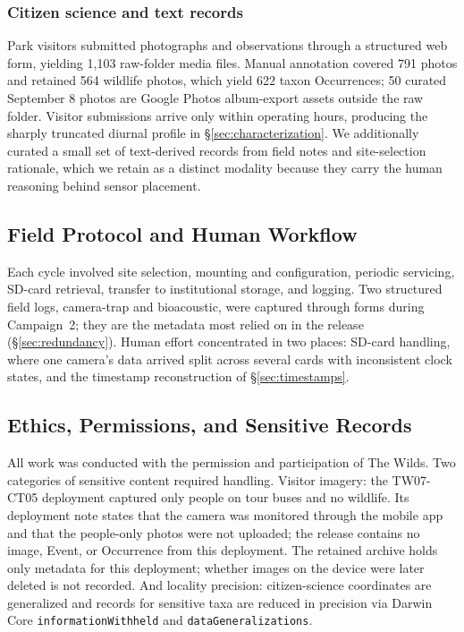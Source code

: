 \documentclass[sigconf]{acmart}
\begin{document}
\subsubsection{Citizen science and text records}
Park visitors submitted photographs and observations through a
structured web form, yielding 1{,}103 raw-folder media files. Manual annotation
covered 791 photos and retained 564 wildlife photos, which yield 622 taxon
Occurrences; 50 curated September 8 photos are Google Photos album-export assets
outside the raw folder. Visitor submissions arrive only within operating hours,
producing the sharply truncated
diurnal profile in \S\ref{sec:characterization}. We additionally
curated a small set of text-derived records from field notes and
site-selection rationale, which we retain as a distinct modality
because they carry the human reasoning behind sensor placement.

\subsection{Field Protocol and Human Workflow}

Each cycle involved site selection, mounting and configuration,
periodic servicing, SD-card retrieval, transfer to institutional
storage, and logging. Two structured field logs, camera-trap and
bioacoustic, were captured through forms during Campaign~2; they are the
metadata most relied on in the release (\S\ref{sec:redundancy}). Human effort concentrated in two places: SD-card handling, where one camera's data arrived split
across several cards with inconsistent clock states, and the timestamp
reconstruction of \S\ref{sec:timestamps}.

\subsection{Ethics, Permissions, and Sensitive Records}

All work was conducted with the permission and participation of The
Wilds. Two categories of sensitive content required handling. Visitor
imagery: the TW07-CT05 deployment captured only people on tour buses and
no wildlife. Its deployment note states that the camera was monitored
through the mobile app and that the people-only photos were not uploaded;
the release contains no image, Event, or Occurrence from this deployment.
The retained archive holds only metadata for this deployment; whether
images on the device were later deleted is not recorded. And locality precision: citizen-science
coordinates are generalized and records for sensitive taxa are reduced
in precision via Darwin Core \texttt{informationWithheld} and
\texttt{dataGeneralizations}.
\end{document}
